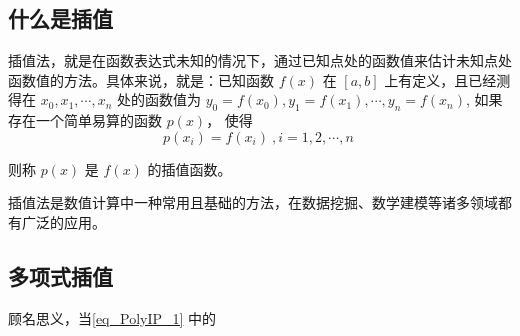 \subsection{什么是插值}
插值法，就是在函数表达式未知的情况下，通过已知点处的函数值来估计未知点处函数值的方法。具体来说，就是：已知函数 $f(x)$ 在 $\left[a,b\right] $ 上有定义，且已经测得在 $x_0,x_1,\cdots, x_n$ 处的函数值为 $y_0 = f(x_0),y_1 = f(x_1), \cdots, y_n = f(x_n)$, 如果存在一个简单易算的函数 $p(x)$， 使得\begin{equation}
\label{eq_PolyIP_1}
p(x_i) = f(x_i)~, i = 1,2, \cdots, n~
\end{equation}

则称 $p(x)$ 是 $f(x)$ 的插值函数。

插值法是数值计算中一种常用且基础的方法，在数据挖掘、数学建模等诸多领域都有广泛的应用。

\subsection{多项式插值}
顾名思义，当\autoref{eq_PolyIP_1} 中的
